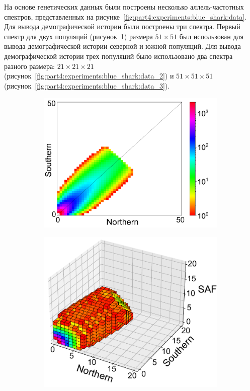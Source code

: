 На основе генетических данных были построены несколько аллель-частотных спектров, представленных на рисунке~\ref{fig:part4:experiments:blue_shark:data}.
Для вывода демографической истории были построены три спектра.
Первый спектр для двух популяций (рисунок~\ref{fig:part4:experiments:blue_shark:data_1}) размера $51\times51$ был использован для вывода демографической истории северной и южной популяций.
Для вывода демографической истории трех популяций было использовано два спектра разного размера: $21\times21\times21$ (рисунок~\ref{fig:part4:experiments:blue_shark:data_2}) и $51\times51\times51$ (рисунок~\ref{fig:part4:experiments:blue_shark:data_3}).

\begin{figure}[ht]
    \centering
    \begin{subfigure}[b]{0.4\linewidth}
        \centering
        \includegraphics[width=\textwidth]{images_experiments/blue_shark/2pop_afs.pdf}
        \caption{}
        \label{fig:part4:experiments:blue_shark:data_1}
    \end{subfigure}
    \begin{subfigure}[b]{0.4\linewidth}
        \centering
        \includegraphics[width=\textwidth]{images_experiments/blue_shark/3pop_afs_20.pdf}

\end{subfigure}
\end{figure}
